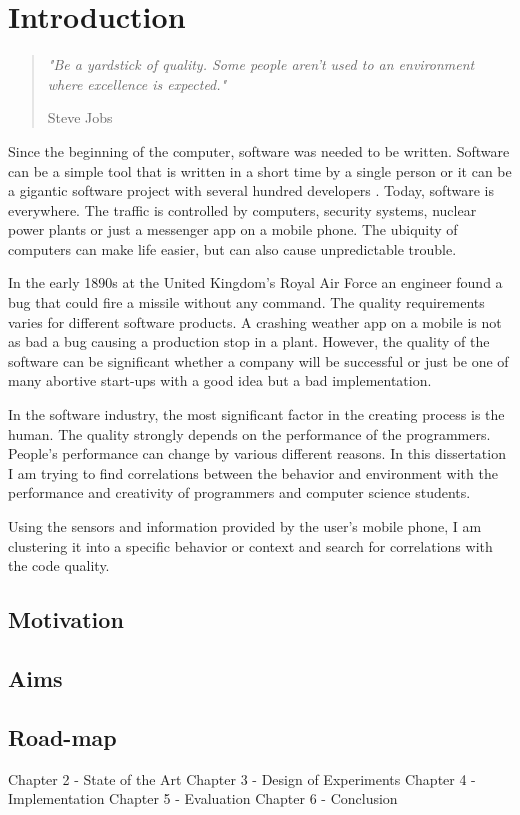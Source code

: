 \chapter{Introduction}

\begin{quote}
\centering 
\em %
"Be a yardstick of quality. Some people aren't used to an environment where excellence is expected."

\medskip
\raggedleft
Steve Jobs
\end{quote}
\vspace*{\fill}

\begin{flushleft}
Since the beginning of the computer, software was needed to be written. Software can be a simple tool that is written in a short time by a single person or it can be a gigantic software project with several hundred developers \cite{cusumano1997microsoft}.
Today, software is everywhere. The traffic is controlled by computers, security systems, nuclear power plants or just a messenger app on a mobile phone. 
The ubiquity of computers can make life easier, but can also cause unpredictable trouble.

In the early 1890s at the United Kingdom's Royal Air Force an engineer found a bug that could fire a missile without any command. \cite{ross2005exterminators}
The quality requirements varies for different software products. A crashing weather app on a mobile is not as bad a bug causing a production stop in a plant. 
However, the quality of the software can be significant whether a company will be successful or just be one of many abortive start-ups with a good idea but a bad implementation. 

In the software industry, the most significant factor in the creating process is the human. The quality strongly depends on the performance of the programmers. 
People's performance can change by various different reasons. In this dissertation I am trying to find correlations between the behavior and environment with the performance and creativity of programmers and computer science students. 

Using the sensors and information provided by the user's mobile phone, I am clustering it into a specific behavior or context and search for correlations with the code quality. 

\end{flushleft}



\section{Motivation}

\section{Aims}

\section{Road-map}
	Chapter 2 - State of the Art
	Chapter 3 - Design of Experiments 
	Chapter 4 - Implementation
	Chapter 5 - Evaluation
	Chapter 6 - Conclusion 

